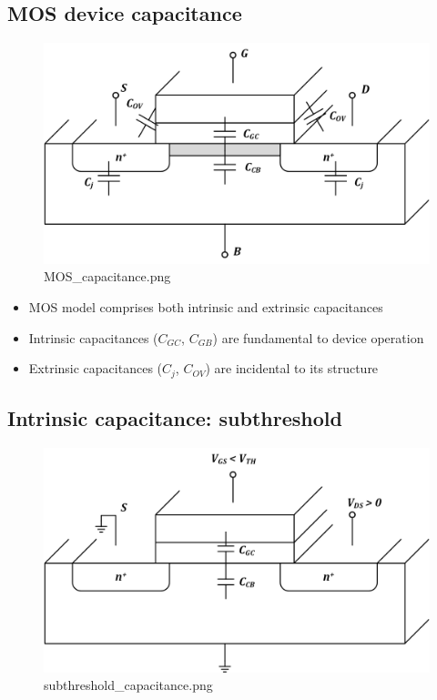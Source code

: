 \documentclass[11pt]{article}
\providecommand{\tightlist}{%
      \setlength{\itemsep}{0pt}\setlength{\parskip}{0pt}}
\begin{document}
    \hypertarget{mos-device-capacitance}{%
\subsection{MOS device capacitance}\label{mos-device-capacitance}}

    \begin{figure}
\centering
\includegraphics{MOS_capacitance.png}
\caption{MOS\_capacitance.png}
\end{figure}

    \begin{itemize}
\tightlist
\item
  MOS model comprises both intrinsic and extrinsic capacitances
\item
  Intrinsic capacitances (\(C_{GC}\), \(C_{GB}\)) are fundamental to
  device operation
\item
  Extrinsic capacitances (\(C_j\), \(C_{OV}\)) are incidental to its
  structure
\end{itemize}

    \hypertarget{intrinsic-capacitance-subthreshold}{%
\subsection{Intrinsic capacitance:
subthreshold}\label{intrinsic-capacitance-subthreshold}}

    \begin{figure}
\centering
\includegraphics{subthreshold_capacitance.png}
\caption{subthreshold\_capacitance.png}
\end{figure}
\end{document}
